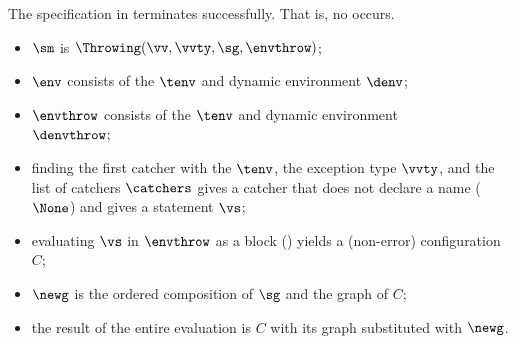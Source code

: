
The specification in  terminates successfully.
That is, no \dynamicerrorterm{} occurs.

\ProseParagraph
\AllApply
\begin{itemize}
  \item $\sm$ is $\Throwing(\vv, \vvty, \sg, \envthrow)$;
  \item $\env$ consists of the \staticenvironmentterm{} $\tenv$ and dynamic environment $\denv$;
  \item $\envthrow$ consists of the \staticenvironmentterm{} $\tenv$ and dynamic environment \\ $\denvthrow$;
  \item finding the first catcher with the \staticenvironmentterm{} $\tenv$, the exception type $\vvty$,
        and the list of catchers $\catchers$ gives a catcher that does not declare a name ($\None$) and gives a statement $\vs$;
  \item evaluating $\vs$ in $\envthrow$ as a block () yields a (non-error)
        configuration $C$\ProseOrDynErrorDiverging;
  \item $\newg$ is the ordered composition of $\sg$ and the graph of $C$;
  \item the result of the entire evaluation is $C$ with its graph substituted with $\newg$.
\end{itemize}

\FormallyParagraph
\begin{mathpar}
\end{mathpar}

